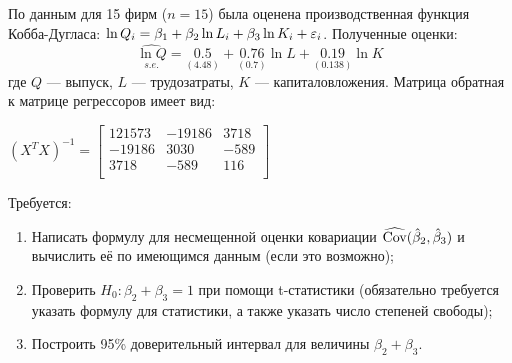 \documentclass[pdftex,11pt,openany]{book}\usepackage[]{graphicx}\usepackage[]{color}
\begin{document}
\begin{problem}
По данным для 15 фирм ($n = 15$) была оценена производственная функция Кобба-Дугласа: $\ln Q_i = \beta_1 + \beta_2 \ln L_i + \beta_3 \ln K_i + \varepsilon_i$. Полученные оценки: $$\underset{s.e.}{\widehat{\ln Q}} = \underset{(4.48)}{0.5} + \underset{(0.7)}{0.76} \ln L + \underset{(0.138)}{0.19} \ln K$$где $Q$ --- выпуск, $L$ --- трудозатраты, $K$ --- капиталовложения. Матрица обратная к матрице регрессоров имеет вид:

$(X^T X)^{-1} = \begin{bmatrix}
121573 & -19186 & 3718 \\
-19186 & 3030 & -589 \\
3718 & -589 & 116 \\
\end{bmatrix}$

Требуется:
\begin{enumerate}
\item Написать формулу для несмещенной оценки ковариации $\widehat{\operatorname{Cov}}(\hat{\beta}_2, \hat{\beta}_3)$ и вычислить её по имеющимся данным (если это возможно);
\item Проверить $H_0: \beta_2 + \beta_3 = 1$ при помощи t-статистики (обязательно требуется указать формулу для статистики, а также указать число степеней свободы);
\item Построить 95\% доверительный интервал для величины $\beta_2 + \beta_3$.
\end{enumerate}
\end{problem}
\end{document}

